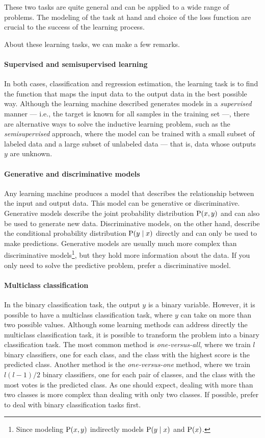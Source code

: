 These two tasks are quite general and can be applied to a wide range of problems.  The
modeling of the task at hand and choice of the loss function are crucial to the success of
the learning process.

About these learning tasks, we can make a few remarks.

\paragraph{Supervised and semisupervised learning}
In both cases, classification and regression estimation, the learning task is to find the function
that maps the input data to the output data in the best possible way.  Although the
learning machine described generates models in a \emph{supervised} manner --- i.e., the target
is known for all samples in the training set ---, there are
alternative ways to solve the inductive learning problem, such as the \emph{semisupervised}
approach, where the model can be trained with a small subset of labeled data and a large
subset of unlabeled data --- that is, data whose outputs $y$ are unknown.

\paragraph{Generative and discriminative models}
Any learning machine produces a model that describes the relationship between the input
and output data.  This model can be generative or discriminative.  Generative models
describe the joint probability distribution $\operatorname{P}(x, y)$ and can also be used to generate new
data.  Discriminative models, on the other hand, describe the conditional probability
distribution $\operatorname{P}(y \mid x)$ directly and can only be used to make predictions. Generative models are
usually much more complex than discriminative models\footnote{Since modeling $\operatorname{P}(x, y)$
indirectly models $\operatorname{P}(y \mid x)$ and $\operatorname{P}(x)$.}, but they hold more information about
the data.  If you only
need to solve the predictive problem, prefer a discriminative model.

\paragraph{Multiclass classification}
In the binary classification task, the output $y$ is
a binary variable.  However, it is possible to have a multiclass classification task,
where  $y$ can take on more than two possible values.  Although some learning methods can
address directly the multiclass classification task, it is possible to transform the
problem into a binary classification task.  The most common method is
\emph{one-versus-all}, where we train $l$ binary classifiers, one for each class,
and the class with the highest score is the predicted class.  Another method is the
\emph{one-versus-one} method, where we train $l(l-1)/2$ binary classifiers, one for each
pair of classes, and the class with the most votes is the predicted class.
As one should expect, dealing with more than two classes is more complex than dealing
with only two classes.  If possible, prefer to deal with binary classification tasks first.

